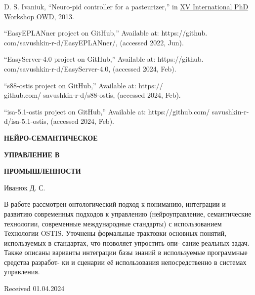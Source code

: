 \documentclass[twocolumn]{scndocument}
\begin{document}
\begin{enumerate}[label=\textbf{[\arabic*]}]
{\item  D. S. Ivaniuk, “Neuro-pid controller for a pasteurizer,” in
\underline{XV International PhD Workshop OWD}, 2013.
\item  “EasyEPLANner project on GitHub,” Available at: https://github.
com/savushkin-r-d/EasyEPLANner/, (accessed 2022, Jun).
\item  “EasyServer-4.0 project on GitHub,” Available at: https://github.
com/savushkin-r-d/EasyServer-4.0, (accessed 2024, Feb).
\item “s88-ostis project on GitHub,” Available at: https:// \\ github.com/
savushkin-r-d/s88-ostis, (accessed 2024, Feb).
\item  “isa-5.1-ostis project on GitHub,” Available at: https://github.com/
savushkin-r-d/isa-5.1-ostis, (accessed 2024, Feb).}
\end{enumerate}  
\begin{center}

\textbf{НЕЙРО-СЕМАНТИЧЕСКОЕ} \par
\textbf{УПРАВЛЕНИЕ В} \par
\textbf{ПРОМЫШЛЕННОСТИ} \par

\large{Иванюк Д. С.}   
\end{center}
\footnotesize{
\par В работе рассмотрен онтологический подход к пониманию,
интеграции и развитию современных подходов к управлению
(нейроуправление, семантические технологии, современные
международные стандарты) с использованием Технологии
OSTIS. Уточнены формальные трактовки основных понятий,
используемых в стандартах, что позволяет упростить опи-
сание реальных задач. Также описаны варианты интеграции
базы знаний в используемые программные средства разработ-
ки и сценарии её использования непосредственно в системах
управления.} 
\begin{flushright}
Received 01.04.2024
\end{flushright}
\end{document}
